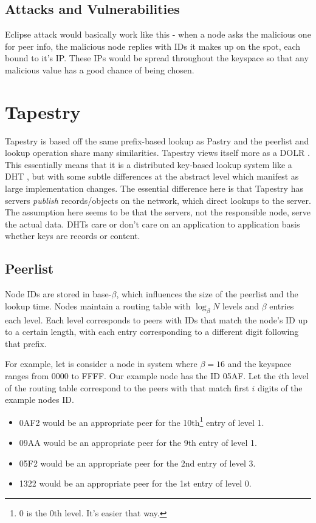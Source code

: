 \documentclass[10pt,letterpaper]{report}
\begin{document}
\subsection*{Attacks and Vulnerabilities}
Eclipse attack would basically work like this -  when a node asks the malicious one for peer info, the malicious node replies with IDs it makes up on the spot, each bound to it's IP. These IPs would be spread throughout the keyspace so that any malicious value has a good chance of being chosen.





\section{Tapestry}
Tapestry \cite{tapestry} is based off the same prefix-based lookup \cite{prr} as Pastry \cite{pastry} and the peerlist and lookup operation share many similarities.
Tapestry views itself more as a DOLR \cite{dolr}.
This essentially means that it is a distributed key-based lookup system like a DHT \cite{hildrum2004distributed}, but with some subtle differences at the abstract level which manifest as large implementation changes.
The essential difference here is that Tapestry has servers \textit{publish} records/objects on the network, which direct lookups to the server.  
The assumption here seems to be that the servers, not the responsible node, serve the actual data.  
DHTs care or don't care on an application to application basis whether keys are records or content. 




\subsection*{Peerlist}
Node IDs are stored in base-$\beta$, which influences the size of the peerlist and the lookup time.
Nodes maintain a routing table with $\log_{\beta}N$ levels and $\beta$ entries each level.
Each level corresponds to peers with IDs that match the node's ID up to a certain length, with each entry corresponding to a different digit following that prefix.

For example, let is consider a node in system where $\beta = 16 $ and the keyspace ranges from $0000$ to FFFF.
Our example node has the ID 05AF.
Let the $i$th level of the routing table correspond to the peers with that match first $i$ digits of the example nodes ID.
\begin{itemize}
	\item 0AF2 would be an appropriate peer for the 10th\footnote{0 is the 0th level.  It's easier that way.} entry of level 1.
	\item 09AA would be an appropriate peer for the 9th entry of level 1.	
	\item 05F2 would be an appropriate peer for the 2nd entry of level 3.
	\item 1322 would be an appropriate peer for the 1st entry of level 0.
\end{itemize}
\end{document}
